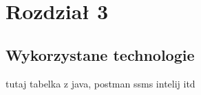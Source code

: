 \chapter{Rozdział 3}
\section{Wykorzystane technologie}

tutaj tabelka z java, postman ssms intelij itd
